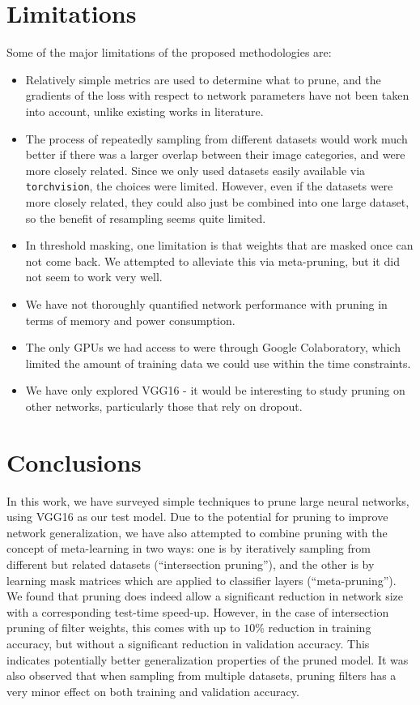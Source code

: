 \documentclass{article}
\begin{document}
\section{Limitations}

Some of the major limitations of the proposed methodologies are:
\begin{itemize}
	\item Relatively simple metrics are used to determine what to prune, and the gradients of the loss with respect to network parameters have not been taken into account, unlike existing works in literature.
	\item The process of repeatedly sampling from different datasets would work much better if there was a larger overlap between their image categories, and were more closely related. Since we only used datasets easily available via \texttt{torchvision}, the choices were limited. However, even if the datasets were more closely related, they could also just be combined into one large dataset, so the benefit of resampling seems quite limited.
	\item In threshold masking, one limitation is that weights that are masked once can not come back. We attempted to alleviate this via meta-pruning, but it did not seem to work very well.
	\item We have not thoroughly quantified network performance with pruning in terms of memory and power consumption.
	\item The only GPUs we had access to were through Google Colaboratory, which limited the amount of training data we could use within the time constraints.
	\item We have only explored VGG16 - it would be interesting to study pruning on other networks, particularly those that rely on dropout.
\end{itemize}

\section{Conclusions}

In this work, we have surveyed simple techniques to prune large neural networks, using VGG16 as our test model. Due to the potential for pruning to improve network generalization, we have also attempted to combine pruning with the concept of meta-learning in two ways: one is by iteratively sampling from different but related datasets (``intersection pruning''), and the other is by learning mask matrices which are applied to classifier layers (``meta-pruning''). We found that pruning does indeed allow a significant reduction in network size with a corresponding test-time speed-up. However, in the case of intersection pruning of filter weights, this comes with up to $10$\% reduction in training accuracy, but without a significant reduction in validation accuracy. This indicates potentially better generalization properties of the pruned model. It was also observed that when sampling from multiple datasets, pruning filters has a very minor effect on both training and validation accuracy.
\end{document}
